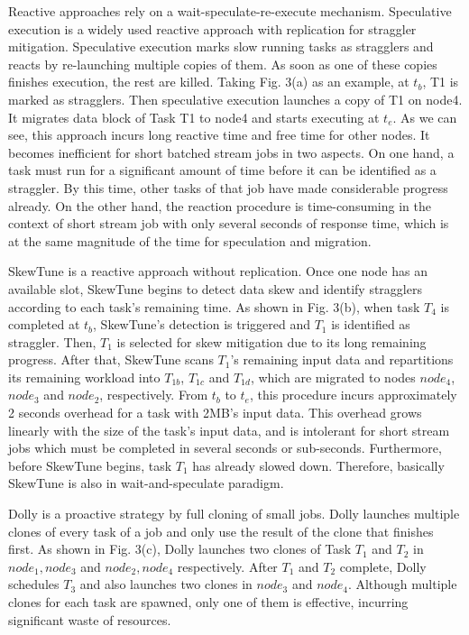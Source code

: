   Reactive approaches rely on a wait-speculate-re-execute mechanism. Speculative execution \cite{Dean2004} is a widely used reactive approach with replication for straggler mitigation. Speculative execution marks slow running tasks as stragglers and reacts by re-launching multiple copies of them. As soon as one of these copies finishes execution, the rest are killed. Taking Fig. 3(a) as an example, at $t_b$, T1 is marked as stragglers. Then speculative execution launches a copy of T1 on node4. It migrates data block of Task T1 to node4 and starts executing at $t_e$. As we can see, this approach incurs long reactive time and free time for other nodes. It becomes inefficient for short batched stream jobs in two aspects. On one hand, a task must run for a significant amount of time before it can be identified as a straggler. By this time, other tasks of that job have made considerable progress already. On the other hand, the reaction procedure is time-consuming in the context of short stream job with only several seconds of response time, which is at the same magnitude of the time for speculation and migration.

  SkewTune \cite{Kwon2012} is  a reactive approach  without replication. Once one node has an available slot, SkewTune begins to detect data skew and identify stragglers according to each task's remaining time. As shown in Fig. 3(b), when task $T_4$ is completed at $t_b$, SkewTune's detection is triggered and $T_1$ is identified as straggler. Then, $T_1$ is selected for skew mitigation due to its long remaining progress. After that, SkewTune scans $T_1$'s remaining input data and repartitions its remaining workload into $T_{1b}$, $T_{1c}$ and $T_{1d}$, which  are  migrated to nodes $node_4$, $node_3$ and $node_2$, respectively. From $t_b$ to $t_e$, this procedure incurs approximately 2 seconds overhead for a task with 2MB's input data. This overhead grows linearly with the size of the task's input data, and is intolerant for short stream jobs which must be completed in several seconds or sub-seconds. Furthermore, before SkewTune begins, task $T_1$ has already slowed down. Therefore, basically SkewTune is also in wait-and-speculate paradigm.

  Dolly \cite{Ananthanarayanan2013} is a proactive strategy by full cloning of small jobs. Dolly launches multiple clones of every task of a job and only use the result of the clone that finishes first. As shown in Fig. 3(c), Dolly launches two clones of Task $T_1$ and $T_2$ in $node_1, node_3$ and $node_2, node_4$ respectively. After $T_1$ and $T_2$ complete, Dolly schedules $T_3$ and also launches two clones in $node_3$ and $node_4$. Although multiple clones for each task are spawned, only one of them is effective, incurring significant waste of resources.

